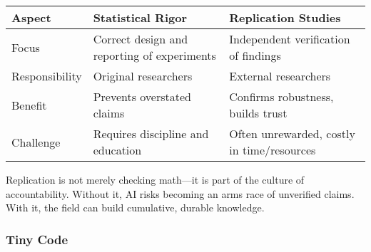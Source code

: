 \documentclass[
  letterpaper,
  DIV=11,
  numbers=noendperiod]{scrreprt}
\begin{document}
\begin{longtable}[]{@{}
  >{\raggedright\arraybackslash}p{}
  >{\raggedright\arraybackslash}p{}
  >{\raggedright\arraybackslash}p{}@{}}
\toprule\noalign{}
\begin{minipage}[b]{\linewidth}\raggedright
Aspect
\end{minipage} & \begin{minipage}[b]{\linewidth}\raggedright
Statistical Rigor
\end{minipage} & \begin{minipage}[b]{\linewidth}\raggedright
Replication Studies
\end{minipage} \\
\midrule\noalign{}
\endhead
\bottomrule\noalign{}
\endlastfoot
Focus & Correct design and reporting of experiments & Independent
verification of findings \\
Responsibility & Original researchers & External researchers \\
Benefit & Prevents overstated claims & Confirms robustness, builds
trust \\
Challenge & Requires discipline and education & Often unrewarded, costly
in time/resources \\
\end{longtable}

Replication is not merely checking math---it is part of the culture of
accountability. Without it, AI risks becoming an arms race of unverified
claims. With it, the field can build cumulative, durable knowledge.

\subsubsection{Tiny Code}\label{tiny-code-94}
\end{document}
